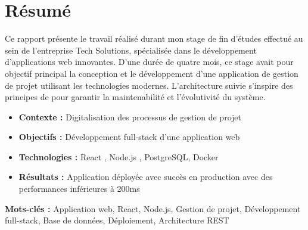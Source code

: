 \chapter*{Résumé}

Ce rapport présente le travail réalisé durant mon stage de fin d'études effectué au sein de l'entreprise Tech Solutions, spécialisée dans le développement d'applications web innovantes. D'une durée de quatre mois, ce stage avait pour objectif principal la conception et le développement d'une application de gestion de projet utilisant les technologies modernes. L'architecture suivie s'inspire des principes de \cite{martin2017clean} pour garantir la maintenabilité et l'évolutivité du système.

\begin{itemize}
	\item \textbf{Contexte :} Digitalisation des processus de gestion de projet
	\item \textbf{Objectifs :} Développement full-stack d'une application web
	\item \textbf{Technologies :} React \cite{react2024}, Node.js \cite{nodejs2024}, PostgreSQL, Docker
	\item \textbf{Résultats :} Application déployée avec succès en production avec des performances inférieures à 200ms
\end{itemize}

\textbf{Mots-clés :} Application web, React, Node.js, Gestion de projet, Développement full-stack, Base de données, Déploiement, Architecture REST \cite{fielding2000rest}